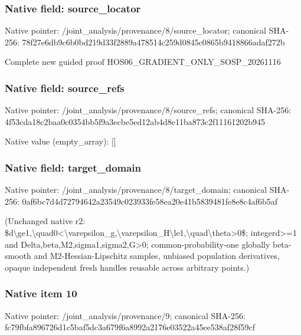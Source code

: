 \documentclass[10pt,a4paper]{article}
\begin{document}
\subsubsection{Native field: source\_\allowbreak{}locator}
Native pointer: /joint\_\allowbreak{}analysis/provenance/8/source\_\allowbreak{}locator; canonical SHA-256: 78f27e6db9c6b0bd219d33f2889a478514c259d0845c0865b9418866adaf272b

\begingroup\raggedright\sloppy Complete new guided proof HOS06\_\allowbreak{}GRADIENT\_\allowbreak{}ONLY\_\allowbreak{}SOSP\_\allowbreak{}20261116\par\endgroup

\subsubsection{Native field: source\_\allowbreak{}refs}
Native pointer: /joint\_\allowbreak{}analysis/provenance/8/source\_\allowbreak{}refs; canonical SHA-256: 4f53cda18c2baa0c0354bb5f9a3ecbe5ed12ab4d8e11ba873c2f11161202b945

Native value (empty\_\allowbreak{}array): []

\subsubsection{Native field: target\_\allowbreak{}domain}
Native pointer: /joint\_\allowbreak{}analysis/provenance/8/target\_\allowbreak{}domain; canonical SHA-256: 0af6bc7d4d72794642a23549c023933fe58ea20e41b5839481fe8e8c4af6b5af

\begingroup\raggedright\sloppy (Unchanged native r2:\allowbreak{} \$d\textbackslash{}ge1,\allowbreak{}\textbackslash{}quad0<\textbackslash{}varepsilon\_\allowbreak{}g,\allowbreak{}\textbackslash{}varepsilon\_\allowbreak{}H\textbackslash{}le1,\allowbreak{}\textbackslash{}quad\textbackslash{}theta>0\$;\allowbreak{} integerd>=\allowbreak{}1 and Delta,\allowbreak{}beta,\allowbreak{}M2,\allowbreak{}sigma1,\allowbreak{}sigma2,\allowbreak{}G>0;\allowbreak{} common-probability-one globally beta-smooth and M2-Hessian-Lipschitz samples,\allowbreak{} unbiased population derivatives,\allowbreak{} opaque independent fresh handles reusable across arbitrary points.)\par\endgroup

\subsubsection{Native item 10}
Native pointer: /joint\_\allowbreak{}analysis/provenance/9; canonical SHA-256: fc79fbfa896726d1c5baf5dc3a679f6a8992a2176e03522a45ee538af28f59cf
\end{document}
